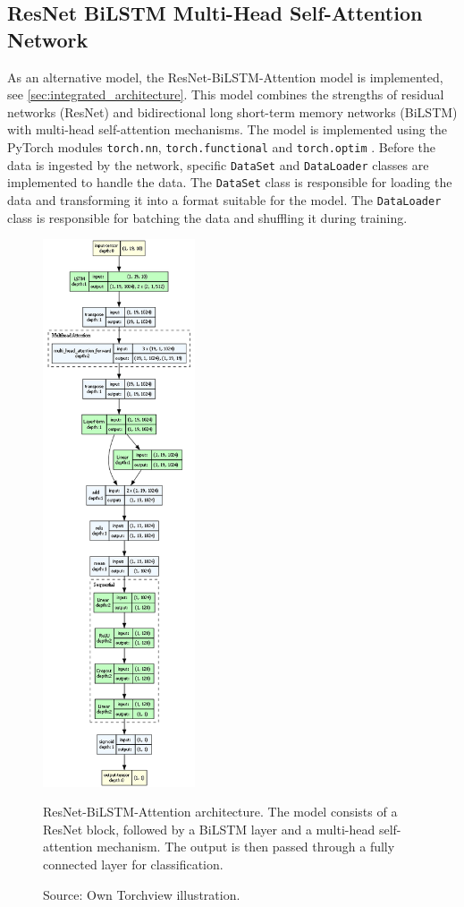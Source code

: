\subsection{ResNet BiLSTM Multi-Head Self-Attention Network}
As an alternative model, the ResNet-BiLSTM-Attention model is implemented, see \autoref{sec:integrated_architecture}. This model combines the strengths of residual networks (ResNet) and bidirectional long short-term memory networks (BiLSTM) with multi-head self-attention mechanisms. The model is implemented using the PyTorch modules \texttt{torch.nn}, \texttt{torch.functional} and \texttt{torch.optim} \autocite{PyTorch}. Before the data is ingested by the network, specific \texttt{DataSet} and \texttt{DataLoader} classes are implemented to handle the data. The \texttt{DataSet} class is responsible for loading the data and transforming it into a format suitable for the model. The \texttt{DataLoader} class is responsible for batching the data and shuffling it during training.

\begin{figure}[htbp]
  \centering
  \includegraphics[width=0.4\textwidth]{figures/architecture.png}
  \caption{ResNet-BiLSTM-Attention architecture. The model consists of a ResNet block, followed by a BiLSTM layer and a multi-head self-attention mechanism. The output is then passed through a fully connected layer for classification.}
  \label{fig:architecture}
  \caption*{Source: Own Torchview illustration.}
\end{figure}

